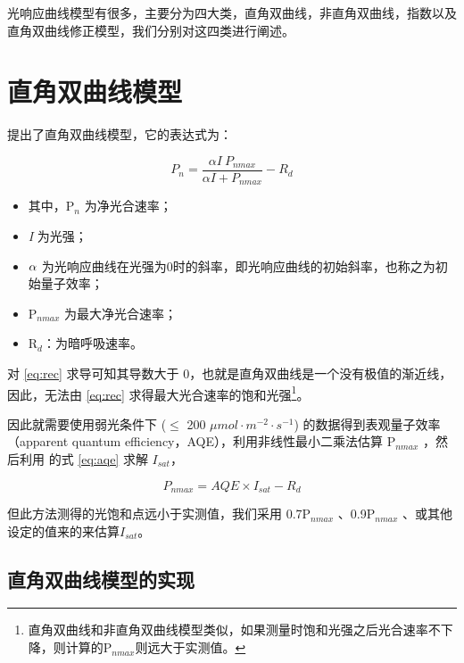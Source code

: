\documentclass[]{krantz}
\providecommand{\tightlist}{%
  \setlength{\itemsep}{0pt}\setlength{\parskip}{0pt}}
\theoremstyle{definition}
\theoremstyle{definition}
\theoremstyle{definition}
\theoremstyle{remark}
\begin{document}
光响应曲线模型有很多，主要分为四大类，直角双曲线，非直角双曲线，指数以及直角双曲线修正模型，我们分别对这四类进行阐述。

\section{直角双曲线模型}

\citet{BalyEC1935} 提出了直角双曲线模型，它的表达式为：

\begin{equation}
P_{n}  = \frac{\alpha I\ P_{nmax}}{\alpha I + P_{nmax}}- R_{d}
\label{eq:rec}
\end{equation}

\begin{itemize}
\tightlist
\item
  其中，P\(_{n}\) 为净光合速率；
\item
  \textsl{I} 为光强；
\item
  \(\text{\ensuremath{\alpha}}\)
  为光响应曲线在光强为0时的斜率，即光响应曲线的初始斜率，也称之为初始量子效率；
\item
  P\(_{nmax}\) 为最大净光合速率；
\item
  R\(_{d}\)：为暗呼吸速率。
\end{itemize}

对 \eqref{eq:rec} 求导可知其导数大于
0，也就是直角双曲线是一个没有极值的渐近线，因此，无法由 \eqref{eq:rec}
求得最大光合速率的饱和光强\footnote{直角双曲线和非直角双曲线模型类似，如果测量时饱和光强之后光合速率不下降，则计算的P\(_{nmax}\)则远大于实测值。}。

因此就需要使用弱光条件下 (\(\leq\) 200
\(\mu mol\cdot m^{-2}\cdot s^{-1}\)) 的数据得到表观量子效率（apparent
quantum efficiency，AQE），利用非线性最小二乘法估算 P\(_{nmax}\)
，然后利用 \citet{YEZiPiao2010} 的式 \eqref{eq:aqe} 求解 \(I_{sat}\)，

\begin{equation}
P_{nmax}= AQE \times I_{sat} - R_{d}
\label{eq:aqe}
\end{equation}

但此方法测得的光饱和点远小于实测值，我们采用 0.7P\(_{nmax}\)
\citet{ZhangXS2009}、0.9P\(_{nmax}\)
\citet{HuangHY2009}、或其他设定的值来的来估算\(I_{sat}\)。

\subsection{直角双曲线模型的实现}
\end{document}

